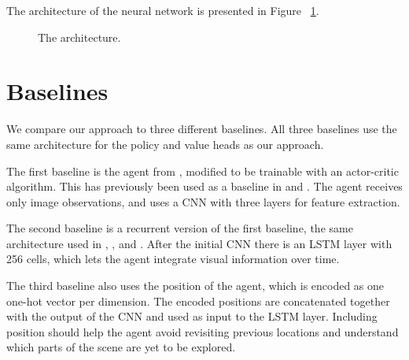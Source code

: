 The architecture of the neural network is presented in Figure ~\ref{fig:approach}.


\begin{figure}
    \centering
    \label{fig:approach}
    \caption[Approach architecture]{The architecture.}
\end{figure}



\section{Baselines}
\label{sec:baseline}


We compare our approach to three different baselines.
All three baselines use the same architecture for the policy and value heads as our approach.

The first baseline is the agent from \cite{mnih_human_2015}, modified to be trainable with an actor-critic algorithm.
This has previously been used as a baseline in \cite{mirowski_navigate_2017} and \cite{cobbe_procgen_2020}.
The agent receives only image observations, and uses a CNN with three layers for feature extraction.

The second baseline is a recurrent version of the first baseline, the same architecture used in \cite{mnih_asynchronous_2016}, \cite{mirowski_navigate_2017}, and \cite{gupta_cognitive_2019}.
After the initial CNN there is an LSTM layer with 256 cells,
which lets the agent integrate visual information over time.

The third baseline also uses the position of the agent, which is encoded as one one-hot vector per dimension. 
The encoded positions are concatenated together with the output of the CNN and used as input to the LSTM layer.
Including position should help the agent avoid revisiting previous locations and understand which parts of the scene are yet to be explored. 


